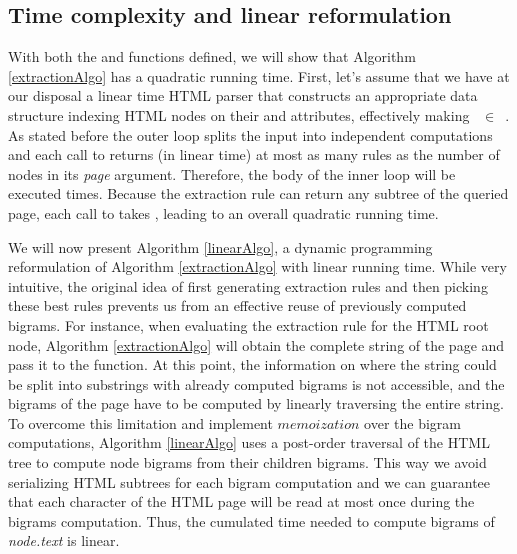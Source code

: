\similarityAlgo

\subsection{Time complexity and linear reformulation}
With both the  and  functions defined, we will show that Algorithm \ref{extractionAlgo} has a quadratic running time. First, let's assume that we have at our disposal a linear time HTML parser that constructs an appropriate data structure indexing HTML nodes on their  and  attributes, effectively making ~$\in$~. As stated before the outer loop splits the input into independent computations and each call to  returns (in linear time) at most as many rules as the number of nodes in its \emph{page} argument. Therefore, the body of the inner loop will be executed  times. Because the extraction rule can return any subtree of the queried page, each call to  takes , leading to an overall quadratic running time.

We will now present Algorithm \ref{linearAlgo}, a dynamic programming reformulation of Algorithm \ref{extractionAlgo} with linear running time. While very intuitive, the original idea of first generating extraction rules and then picking these best rules prevents us from an effective reuse of previously computed bigrams. For instance, when evaluating the extraction rule for the HTML root node, Algorithm \ref{extractionAlgo} will obtain the complete string of the page and pass it to the  function. At this point, the information on where the string could be split into substrings with already computed bigrams is not accessible, and the bigrams of the page have to be computed by linearly traversing the entire string. To overcome this limitation and implement $memoization$ over the bigram computations, Algorithm \ref{linearAlgo} uses a post-order traversal of the HTML tree to compute node bigrams from their children bigrams. This way we avoid serializing HTML subtrees for each bigram computation and we can guarantee that each character of the HTML page will be read at most once during the bigrams computation. Thus, the cumulated time needed to compute bigrams of \emph{node.text} is linear.

\linearAlgo

